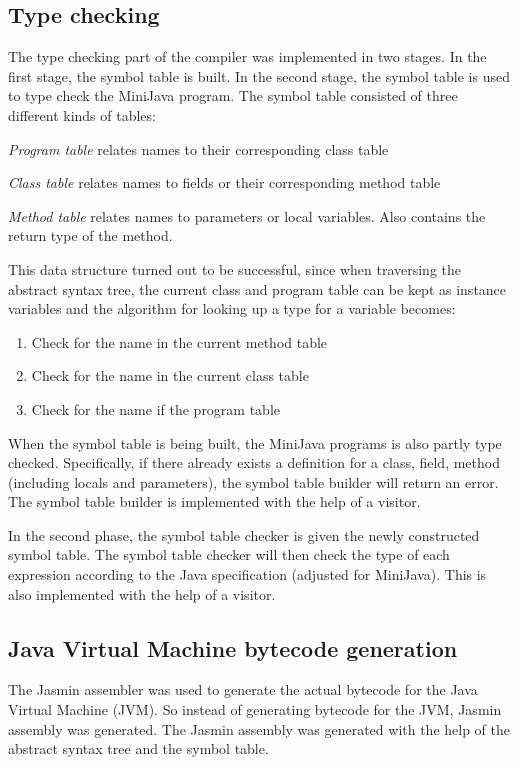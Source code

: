 \documentclass[11pt,oneside,a4paper]{article}
\begin{document}
\subsection{Type checking}
The type checking part of the compiler was implemented in two stages. In the
first stage, the symbol table is built. In the second stage, the symbol table
is used to type check the MiniJava program. The symbol table consisted of three
different kinds of tables:
\begin{description}
\item{\emph{Program table}} relates names to their corresponding class table
\item{\emph{Class table}} relates names to fields or their corresponding method
table
\item{\emph{Method table}} relates names to parameters or local variables. Also
contains the return type of the method.
\end{description}
This data structure turned out to be successful, since when traversing the
abstract syntax tree, the current class and program table can be kept as
instance variables and the algorithm for looking up a type for a variable
becomes:
\begin{enumerate}
\item Check for the name in the current method table
\item Check for the name in the current class table
\item Check for the name if the program table
\end{enumerate}

When the symbol table is being built, the MiniJava programs is also partly type
checked. Specifically, if there already exists a definition for a class, field,
method (including locals and parameters), the symbol table builder will return
an error. The symbol table builder is implemented with the help of a visitor.

In the second phase, the symbol table checker is given the newly constructed 
symbol table. The symbol table checker will then check the type of each
expression according to the Java specification (adjusted for MiniJava). This is
also implemented with the help of a visitor.

\subsection{Java Virtual Machine bytecode generation}
The Jasmin assembler was used to generate the actual bytecode for the Java
Virtual Machine (JVM). So instead of generating bytecode for the JVM,
Jasmin assembly was generated. The Jasmin assembly was generated with the help
of the abstract syntax tree and the symbol table. 
\end{document}
